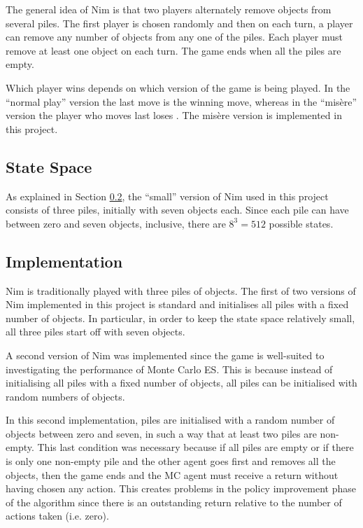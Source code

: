 \documentclass[11pt,a4paper]{report}
\begin{document}
The general idea of Nim \cite{nim-rules} is that two players alternately remove objects from several piles. The first player is chosen randomly and then on each turn, a player can remove any number of objects from any one of the piles. Each player must remove at least one object on each turn. The game ends when all the piles are empty.

Which player wins depends on which version of the game is being played. In the ``normal play'' version the last move is the winning move, whereas in the ``mis\`ere'' version the player who moves last loses \cite{winning-ways-math-plays}. The mis\`ere version is implemented in this project.


\subsection{State Space}

As explained in Section \ref{sec:NimImplementation}, the ``small'' version of Nim used in this project  consists of three piles, initially with seven objects each. Since each pile can have between zero and seven objects, inclusive, there are $8^3 = 512$ possible states.


\subsection{Implementation}
\label{sec:NimImplementation}

Nim is traditionally played with three piles of objects. The first of two versions of Nim implemented in this project is standard and initialises all piles with a fixed number of objects. In particular, in order to keep the state space relatively small, all three piles start off with seven objects.

A second version of Nim was implemented since the game is well-suited to investigating the performance of Monte Carlo ES. This is because instead of initialising all piles with a fixed number of objects, all piles can be initialised with random numbers of objects.

In this second implementation, piles are initialised with a random number of objects between zero and seven, in such a way that at least two piles are non-empty. This last condition was necessary because if all piles are empty or if there is only one non-empty pile and the other agent goes first and removes all the objects, then the game ends and the MC agent must receive a return without having chosen any action. This creates problems in the policy improvement phase of the algorithm since there is an outstanding return relative to the number of actions taken (i.e. zero).
\end{document}
